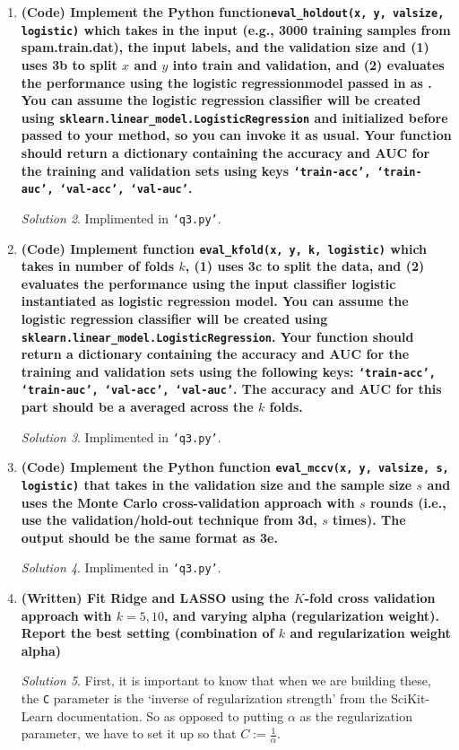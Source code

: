 \documentclass[a4paper,12pt]{article}
\theoremstyle{definition}
\theoremstyle{remark}
\newtheorem*{solution}{Solution}
\begin{document}
\begin{enumerate}
\begin{enumerate}
			\begin{solution}
				Implimented in \texttt{`q3.py'}.
			\end{solution}
			\item {\bf (Code) Implement the Python function\texttt{eval\_holdout(x, y, valsize, logistic)} which takes in the input (e.g., 3000 training samples from spam.train.dat), the input labels, and the validation size and (1) uses 3b to split $x$ and $y$ into train and validation, and (2) evaluates the performance using the logistic regressionmodel passed in as . You can assume the logistic regression classifier will be created using \texttt{sklearn.linear\_model.LogisticRegression} and initialized before passed to your method, so you can invoke it as usual. Your function should return a dictionary containing the accuracy and AUC for the training and validation sets using keys \texttt{‘train-acc’, ‘train-auc’, ‘val-acc’, ‘val-auc’}.}
			\begin{solution}
				Implimented in \texttt{`q3.py'}.
			\end{solution}
			\item {\bf (Code) Implement function \texttt{eval\_kfold(x, y, k, logistic)} which takes in number of folds $k$, (1) uses 3c to split the data, and (2) evaluates the performance using the input classifier logistic instantiated as logistic regression model. You can assume the logistic regression classifier will be created using \texttt{sklearn.linear\_model.LogisticRegression}. Your function should return a dictionary containing the accuracy and AUC for the training and validation sets using the following keys: \texttt{‘train-acc’, ‘train-auc’, ‘val-acc’, ‘val-auc’}. The accuracy and AUC for this part should be a averaged across the $k$ folds.}
			\begin{solution}
				Implimented in \texttt{`q3.py'}.
			\end{solution}
			\item {\bf (Code) Implement the Python function \texttt{eval\_mccv(x, y, valsize, s, logistic)} that takes in the validation size and the sample size $s$ and uses the Monte Carlo cross-validation approach with $s$ rounds (i.e., use the validation/hold-out technique from 3d, $s$ times). The output should be the same format as 3e.}
			\begin{solution}
				Implimented in \texttt{`q3.py'}.
			\end{solution}
			\item {\bf (Written) Fit Ridge and LASSO using the $K$-fold cross validation approach with $k = 5, 10$, and varying alpha (regularization weight). Report the best setting (combination of $k$ and regularization weight alpha)}
			\begin{solution}
				First, it is important to know that when we are building these, the \texttt{C} parameter is the `inverse of regularization strength' from the SciKit-Learn documentation. So as opposed to putting $\alpha$ as the regularization parameter, we have to set it up so that $C := \frac{1}{\alpha}$. 
				

\end{solution}
\end{enumerate}
\end{enumerate}
\end{document}
